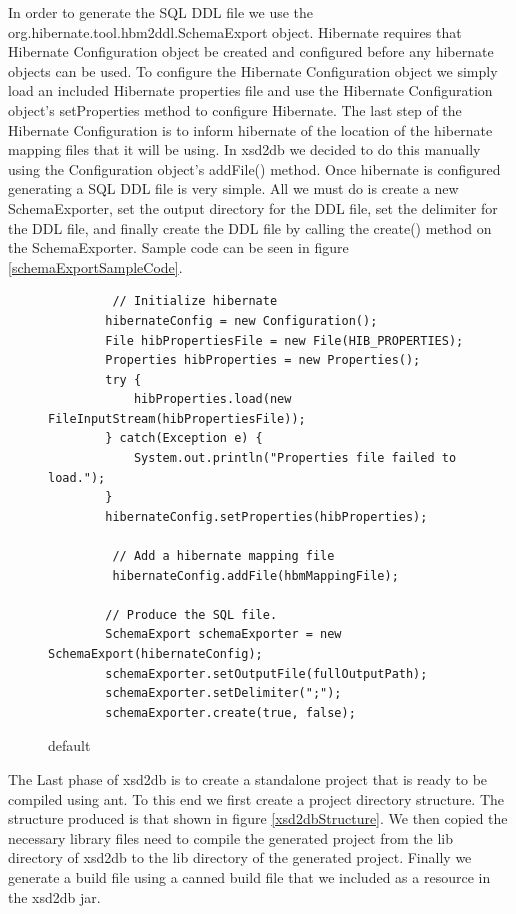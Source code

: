 In order to generate the SQL DDL file we use the org.hibernate.tool.hbm2ddl.SchemaExport object.  Hibernate requires that Hibernate Configuration object be created and configured before any hibernate objects can be used.  To configure the Hibernate Configuration object we simply load an included Hibernate properties file and use the Hibernate Configuration object's setProperties method to configure Hibernate.  The last step of the Hibernate Configuration is to inform hibernate of the location of the hibernate mapping files that it will be using.  In xsd2db we decided to do this manually using the Configuration object's addFile() method.   Once hibernate is configured generating a SQL DDL file is very simple.  All we must do is create a new SchemaExporter, set the output directory for the DDL file, set the delimiter for the DDL file, and finally create the DDL file by calling the create() method on the SchemaExporter.  Sample code can be seen in figure \ref{schemaExportSampleCode}.
\begin{figure}[htbp]
\begin{center}
\begin{verbatim}
         // Initialize hibernate
        hibernateConfig = new Configuration();
        File hibPropertiesFile = new File(HIB_PROPERTIES);
        Properties hibProperties = new Properties();
        try {
            hibProperties.load(new FileInputStream(hibPropertiesFile));
        } catch(Exception e) {
            System.out.println("Properties file failed to load.");
        }
        hibernateConfig.setProperties(hibProperties);

         // Add a hibernate mapping file
         hibernateConfig.addFile(hbmMappingFile);
         
        // Produce the SQL file.
        SchemaExport schemaExporter = new SchemaExport(hibernateConfig);
        schemaExporter.setOutputFile(fullOutputPath);
        schemaExporter.setDelimiter(";");
        schemaExporter.create(true, false);
\end{verbatim}
\caption{default}
\label{default}
\end{center}
\end{figure}

The Last phase of xsd2db is to create a standalone project that is ready to be compiled using ant.  To this end we first create a project directory structure. The structure produced is that shown in figure \ref{xsd2dbStructure}.  We then copied the necessary library files need to compile the generated project from the lib directory of xsd2db to the lib directory of the generated project.  Finally we generate a build file using a canned build file that we included as a resource in the xsd2db jar.   

